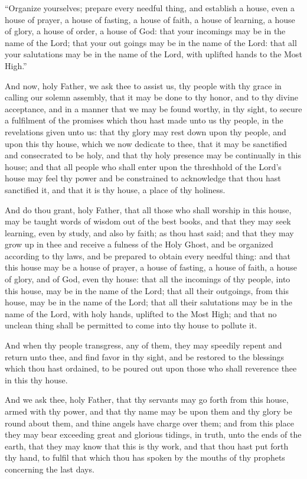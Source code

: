 					``Organize yourselves; prepare every needful thing, and establish a house, even a house of prayer, a house of fasting, a house of faith, a house of learning, a house of glory, a house of order, a house of God: that your incomings may be in the name of the Lord; that your out goings may be in the name of the Lord: that all your salutations may be in the name of the Lord, with uplifted hands to the Most High.''

					And now, holy Father, we ask thee to assist us, thy people with thy grace in calling our solemn assembly, that it may be done to thy honor, and to thy divine acceptance, and in a manner that we may be found worthy, in thy sight, to secure a fulfilment of the promises which thou hast made unto us thy people, in the revelations given unto us: that thy glory may rest down upon thy people, and upon this thy house, which we now dedicate to thee, that it may be sanctified and consecrated to be holy, and that thy holy presence may be continually in this house; and that all people who shall enter upon the threshhold of the Lord's house may feel thy power and be constrained to acknowledge that thou hast sanctified it, and that it is thy house, a place of thy holiness.

					And do thou grant, holy Father, that all those who shall worship in this house, may be taught words of wisdom out of the best books, and that they may seek learning, even by study, and also by faith; as thou hast said; and that they may grow up in thee and receive a fulness of the Holy Ghost, and be organized according to thy laws, and be prepared to obtain every needful thing: and that this house may be a house of prayer, a house of fasting, a house of faith, a house of glory, and of God, even thy house: that all the incomings of thy people, into this house, may be in the name of the Lord; that all their outgoings, from this house, may be in the name of the Lord; that all their salutations may be in the name of the Lord, with holy hands, uplifted to the Most High; and that no unclean thing shall be permitted to come into thy house to pollute it.

					And when thy people transgress, any of them, they may speedily repent and return unto thee, and find favor in thy sight, and be restored to the blessings which thou hast ordained, to be poured out upon those who shall reverence thee in this thy house.

					And we ask thee, holy Father, that thy servants may go forth from this house, armed with thy power, and that thy name may be upon them and thy glory be round about them, and thine angels have charge over them; and from this place they may bear exceeding great and glorious tidings, in truth, unto the ends of the earth, that they may know that this is thy work, and that thou hast put forth thy hand, to fulfil that which thou has spoken by the mouths of thy prophets concerning the last days.

